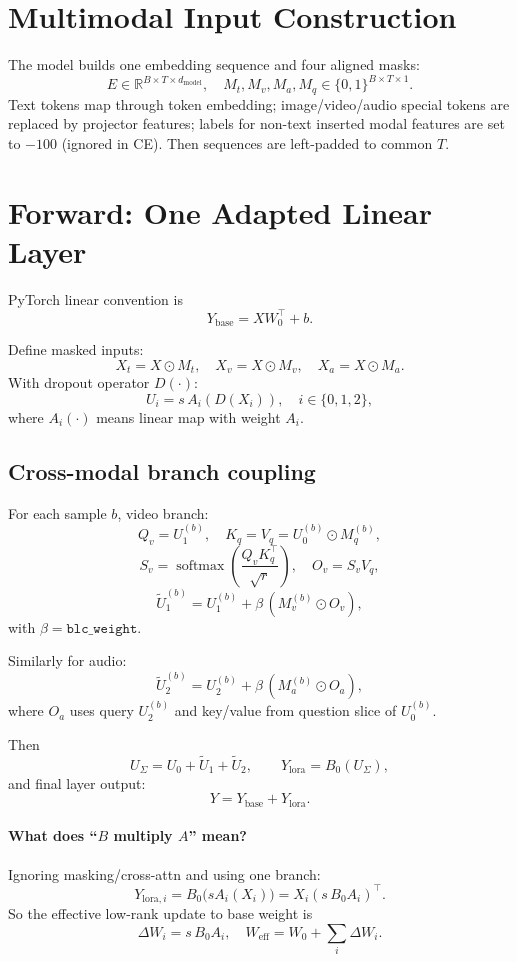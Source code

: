 \documentclass[11pt]{article}
\begin{document}
\section{Multimodal Input Construction}
The model builds one embedding sequence and four aligned masks:
\[
E\in\mathbb{R}^{B\times T\times d_{\text{model}}},\quad
M_t,M_v,M_a,M_q\in\{0,1\}^{B\times T\times 1}.
\]
Text tokens map through token embedding; image/video/audio special tokens are replaced by projector features; labels for non-text inserted modal features are set to $-100$ (ignored in CE). Then sequences are left-padded to common $T$.

\section{Forward: One Adapted Linear Layer}
PyTorch linear convention is
\[
Y_{\text{base}} = XW_0^\top + b.
\]

Define masked inputs:
\[
X_t=X\odot M_t,\quad X_v=X\odot M_v,\quad X_a=X\odot M_a.
\]
With dropout operator $D(\cdot)$:
\[
U_i = s\,A_i(D(X_i)),\quad i\in\{0,1,2\},
\]
where $A_i(\cdot)$ means linear map with weight $A_i$.

\subsection{Cross-modal branch coupling}
For each sample $b$, video branch:
\[
Q_v=U_1^{(b)},\quad K_q=V_q=U_0^{(b)}\odot M_q^{(b)},
\]
\[
S_v=\operatorname{softmax}\!\left(\frac{Q_vK_q^\top}{\sqrt{r}}\right),\quad
O_v=S_vV_q,
\]
\[
\widetilde U_1^{(b)} = U_1^{(b)} + \beta\,(M_v^{(b)}\odot O_v),
\]
with $\beta=\texttt{blc\_weight}$.

Similarly for audio:
\[
\widetilde U_2^{(b)} = U_2^{(b)} + \beta\,(M_a^{(b)}\odot O_a),
\]
where $O_a$ uses query $U_2^{(b)}$ and key/value from question slice of $U_0^{(b)}$.

Then
\[
U_{\Sigma}=U_0+\widetilde U_1+\widetilde U_2,\qquad
Y_{\text{lora}} = B_0(U_{\Sigma}),
\]
and final layer output:
\[
Y = Y_{\text{base}} + Y_{\text{lora}}.
\]

\paragraph{What does ``$B$ multiply $A$'' mean?}
Ignoring masking/cross-attn and using one branch:
\[
Y_{\text{lora},i}=B_0\big(sA_i(X_i)\big)
= X_i(s\,B_0A_i)^\top.
\]
So the effective low-rank update to base weight is
\[
\Delta W_i = s\,B_0A_i,\quad
W_{\text{eff}} = W_0 + \sum_i \Delta W_i.
\]
\end{document}
